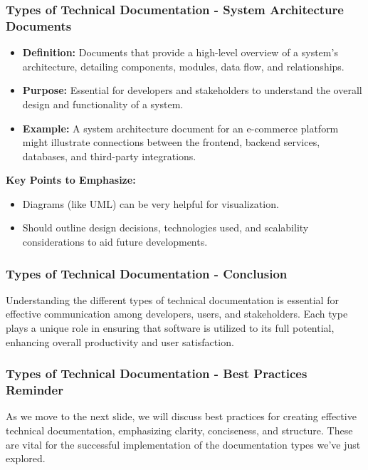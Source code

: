 \documentclass{beamer}
\begin{document}
\begin{frame}[fragile]
    \frametitle{Types of Technical Documentation - System Architecture Documents}
    \begin{itemize}
        \item \textbf{Definition:} Documents that provide a high-level overview of a system's architecture, detailing components, modules, data flow, and relationships.
        \item \textbf{Purpose:} Essential for developers and stakeholders to understand the overall design and functionality of a system.
        \item \textbf{Example:} A system architecture document for an e-commerce platform might illustrate connections between the frontend, backend services, databases, and third-party integrations.
    \end{itemize}

    \textbf{Key Points to Emphasize:}
    \begin{itemize}
        \item Diagrams (like UML) can be very helpful for visualization.
        \item Should outline design decisions, technologies used, and scalability considerations to aid future developments.
    \end{itemize}
\end{frame}

\begin{frame}[fragile]
    \frametitle{Types of Technical Documentation - Conclusion}
    Understanding the different types of technical documentation is essential for effective communication among developers, users, and stakeholders. Each type plays a unique role in ensuring that software is utilized to its full potential, enhancing overall productivity and user satisfaction.
\end{frame}

\begin{frame}[fragile]
    \frametitle{Types of Technical Documentation - Best Practices Reminder}
    As we move to the next slide, we will discuss best practices for creating effective technical documentation, emphasizing clarity, conciseness, and structure. These are vital for the successful implementation of the documentation types we've just explored.
\end{frame}
\end{document}
